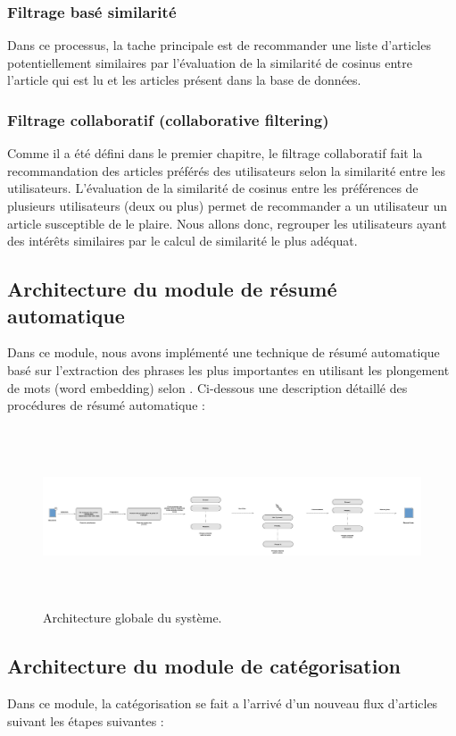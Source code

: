 \subsubsection{Filtrage basé similarité}
Dans ce processus, la tache principale est de recommander une liste d'articles potentiellement similaires par l'évaluation de la similarité de cosinus entre l'article qui est lu et les articles présent dans la base de données.
 
\subsubsection{Filtrage collaboratif (collaborative filtering)}
Comme il a été défini dans le premier chapitre, le filtrage collaboratif fait la recommandation des articles préférés des utilisateurs selon la similarité entre les utilisateurs. L'évaluation de la similarité de cosinus entre les préférences de plusieurs utilisateurs (deux ou plus) permet de recommander a un utilisateur un article susceptible de le plaire. 
Nous allons donc, regrouper les utilisateurs ayant des intérêts similaires par le calcul de similarité le plus adéquat.

\subsection{Architecture du module de résumé automatique}
Dans ce module, nous avons implémenté une technique de résumé automatique basé sur l'extraction des phrases les plus importantes en utilisant les plongement de mots (word embedding) selon \cite{extractiveword2vec}. Ci-dessous une description détaillé des procédures de résumé automatique :

\begin{figure}[H]
    \centering
    \includegraphics[height=150pt,width=500pt]{img/chapter3/ressche.jpg}
    \caption{Architecture globale du système.}
\end{figure}


\subsection{Architecture du module de catégorisation}
Dans ce module, la catégorisation se fait a l'arrivé d'un nouveau flux d'articles suivant les étapes suivantes :

